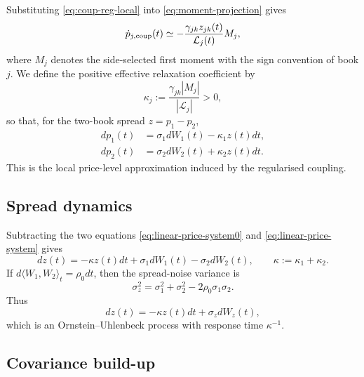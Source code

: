 \documentclass[5p,final]{elsarticle}
\begin{document}
Substituting \eqref{eq:coup-reg-local} into \eqref{eq:moment-projection} gives
\begin{equation}
\dot p_{j,\rm coup}(t)
\simeq
-\frac{\gamma_{jk}z_{jk}(t)}{\mathcal L_j(t)}M_j,
\end{equation}
where $M_j$ denotes the side-selected first moment with the sign convention of book $j$.  We define the positive effective relaxation coefficient by
\begin{equation}
\kappa_j:=\frac{\gamma_{jk}|M_j|}{|\mathcal L_j|}>0,
\end{equation}
so that, for the two-book spread $z=p_1-p_2$,
\begin{align}
dp_1(t)&=\sigma_1dW_1(t)-\kappa_1z(t)dt,\label{eq:linear-price-system0} \\
dp_2(t)&=\sigma_2dW_2(t)+\kappa_2z(t)dt.
\label{eq:linear-price-system}
\end{align}
This is the local price-level approximation induced by the regularised coupling.

\subsection{Spread dynamics}

Subtracting the two equations \eqref{eq:linear-price-system0} and \eqref{eq:linear-price-system} gives
\begin{equation}
dz(t)=-\kappa z(t)dt+\sigma_1dW_1(t)-\sigma_2dW_2(t),
\qquad
\kappa:=\kappa_1+\kappa_2.
\end{equation}
If $d\langle W_1,W_2\rangle_t=\rho_0dt$, then the spread-noise variance is
\begin{equation}
\sigma_z^2=\sigma_1^2+\sigma_2^2-2\rho_0\sigma_1\sigma_2.
\end{equation}
Thus
\begin{equation}
dz(t)=-\kappa z(t)dt+\sigma_zdW_z(t),
\end{equation}
which is an Ornstein--Uhlenbeck process with response time $\kappa^{-1}$.

\subsection{Covariance build-up}
\end{document}
